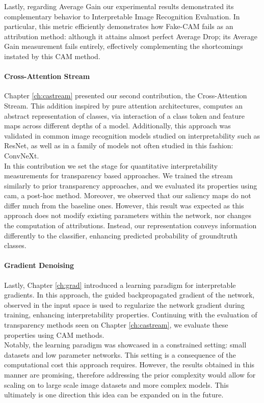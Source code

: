 \noindent Lastly, regarding Average Gain our experimental results demonstrated its complementary 
behavior to Interpretable Image Recognition Evaluation.  In particular, this metric efficiently 
demonstrates how Fake-CAM fails as an attribution method: although it attains almost perfect 
Average Drop; its Average Gain measurement fails entirely, effectively complementing the 
shortcomings instated by this CAM method.\\

\paragraph{Cross-Attention Stream}
\noindent Chapter \ref{ch:castream} presented our second contribution, the Cross-Attention Stream. 
This addition inspired by pure attention architectures, computes an abstract representation of 
classes, via interaction of a class token and feature maps across different depths of a model. 
Additionally, this approach was validated in common image recognition models studied on 
interpretability such as ResNet, as well as in a family of models not often studied in this fashion: 
ConvNeXt.\\

\noindent In this contribution we set the stage for quantitative interpretability measurements for 
transparency based approaches. We trained the stream similarly to prior transparency approaches, 
and we evaluated its properties using \gls{cam}, a post-hoc method. Moreover, we observed that our 
saliency maps do not differ much from the baseline ones. However, this result was expected as this 
approach does not modify existing parameters within the network, nor changes the computation of 
attributions. Instead, our representation conveys information differently to the classifier, 
enhancing predicted probability of groundtruth classes. \\

\paragraph{Gradient Denoising}
\noindent Lastly, Chapter \ref{ch:grad} introduced a learning paradigm for interpretable gradients. 
In this approach, the guided backpropagated gradient of the network, observed in the input space is 
used to regularize the network gradient during training, enhancing interpretability properties. 
Continuing with the evaluation of transparency methods seen on Chapter \ref{ch:castream}, we 
evaluate these properties using CAM methods.\\

\noindent Notably, the learning paradigm was showcased in a constrained setting: small datasets and 
low parameter networks. This setting is a consequence of the computational cost this approach 
requires. However, the results obtained in this manner are promising, therefore addressing the 
prior complexity would allow for scaling on to large scale image datasets and more complex models. 
This ultimately is one direction this idea can be expanded on in the future. 